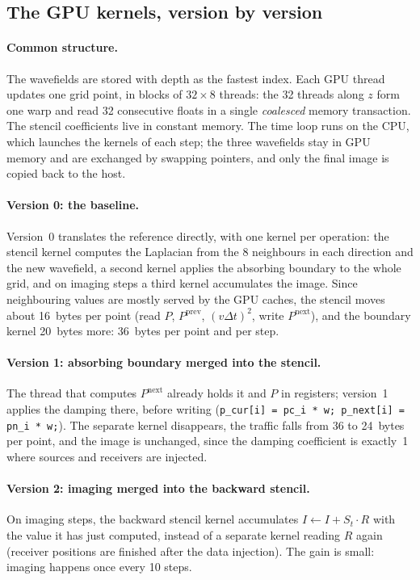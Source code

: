 \documentclass[letterpaper,11pt,leqno]{article}
\begin{document}
\subsection{The GPU kernels, version by version}\label{s:kernels}

\paragraph{Common structure.} The wavefields are stored with depth as the fastest index. Each GPU thread updates one grid point, in blocks of $32 \times 8$ threads: the 32 threads along $z$ form one warp and read 32 consecutive floats in a single \emph{coalesced} memory transaction. The stencil coefficients live in constant memory. The time loop runs on the CPU, which launches the kernels of each step; the three wavefields stay in GPU memory and are exchanged by swapping pointers, and only the final image is copied back to the host.

\paragraph{Version 0: the baseline.} Version~0 translates the reference directly, with one kernel per operation: the stencil kernel computes the Laplacian from the 8 neighbours in each direction and the new wavefield, a second kernel applies the absorbing boundary to the whole grid, and on imaging steps a third kernel accumulates the image. Since neighbouring values are mostly served by the GPU caches, the stencil moves about 16~bytes per point (read $P$, $P^{\mathrm{prev}}$, $(v\Delta t)^2$, write $P^{\mathrm{next}}$), and the boundary kernel 20~bytes more: 36~bytes per point and per step.

\paragraph{Version 1: absorbing boundary merged into the stencil.} The thread that computes $P^{\mathrm{next}}$ already holds it and $P$ in registers; version~1 applies the damping there, before writing (\texttt{p\_cur[i] = pc\_i * w; p\_next[i] = pn\_i * w;}). The separate kernel disappears, the traffic falls from 36 to 24~bytes per point, and the image is unchanged, since the damping coefficient is exactly~1 where sources and receivers are injected.

\paragraph{Version 2: imaging merged into the backward stencil.} On imaging steps, the backward stencil kernel accumulates $I \gets I + S_t \cdot R$ with the value it has just computed, instead of a separate kernel reading $R$ again (receiver positions are finished after the data injection). The gain is small: imaging happens once every 10 steps.
\end{document}
